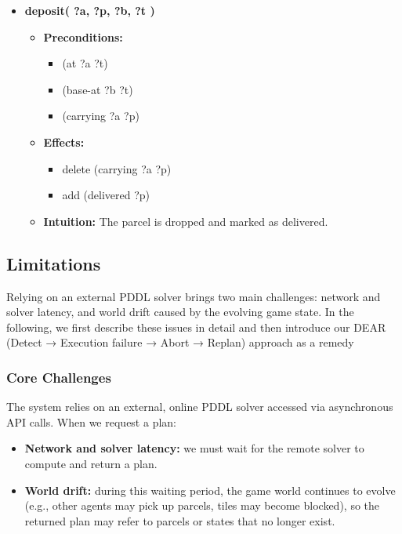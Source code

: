 \begin{itemize}[leftmargin=*]
  \item \textbf{deposit( ?a, ?p, ?b, ?t )}
    \begin{itemize}[leftmargin=1.5em]
      \item \textbf{Preconditions:}
        \begin{itemize}
          \item (at ?a ?t)
          \item (base-at ?b ?t)
          \item (carrying ?a ?p)
        \end{itemize}
      \item \textbf{Effects:}
        \begin{itemize}
          \item delete (carrying ?a ?p)
          \item add    (delivered ?p)
        \end{itemize}
      \item \textbf{Intuition:} The parcel is dropped and marked as delivered.
    \end{itemize}
\end{itemize}


\subsection{Limitations}
Relying on an external PDDL solver brings two main challenges: network and solver latency, and world drift caused by the evolving game state. In the following, we first describe these issues in detail and then introduce our DEAR (Detect → Execution failure → Abort → Replan) approach as a remedy

\subsubsection*{Core Challenges}

The system relies on an external, online PDDL solver accessed via asynchronous API calls. When we request a plan:

\begin{itemize}
\item \textbf{Network and solver latency:} we must wait for the remote solver to compute and return a plan.
\item \textbf{World drift:} during this waiting period, the game world continues to evolve (e.g., other agents may pick up parcels, tiles may become blocked), so the returned plan may refer to parcels or states that no longer exist.
\end{itemize}

